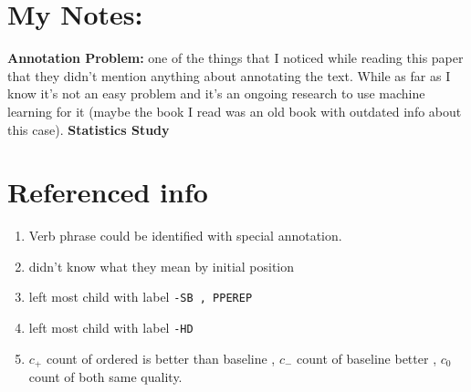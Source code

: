 \documentclass[10pt]{article}
\begin{document}
\begin{multicols*}{2}
\section*{My Notes:}
\textbf{Annotation Problem:} one of the things that I noticed while reading this paper that they didn't mention anything about annotating the text. While as far as I know it's not an easy problem and it's an ongoing research to use machine learning for it (maybe the book I read was an old book with outdated info about this case).
\textbf{Statistics Study}

\section*{Referenced info}
\begin{enumerate}
\item \label{tag:verbphrase} Verb phrase could be identified with special annotation.
\item \label{initial:position} didn't know what they mean by initial position
\item \label{subject} left most child with label \texttt{-SB , PPEREP}
\item \label{head} left most child with label \texttt{-HD}
\item \label{definitions} \(c_+\) count of ordered is better than baseline , \(c_-\) count of baseline better , \(c_0\) count of both same quality.
\end{enumerate}
\end{multicols*}
\end{document}
